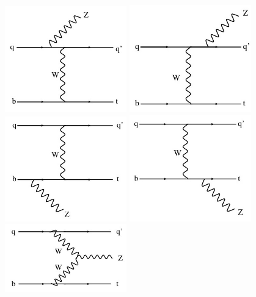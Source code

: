 \begin{figure}[p]
\centering
\includegraphics[width=0.47\textwidth]{figs/top-physics/tZq_feyn1.jpg}
\includegraphics[width=0.47\textwidth]{figs/top-physics/tZq_feyn2.jpg}
\includegraphics[width=0.47\textwidth]{figs/top-physics/tZq_feyn3.jpg}
\includegraphics[width=0.47\textwidth]{figs/top-physics/tZq_feyn4.jpg}
\includegraphics[width=0.47\textwidth]{figs/top-physics/tZq_feyn5.jpg}

\end{figure}
